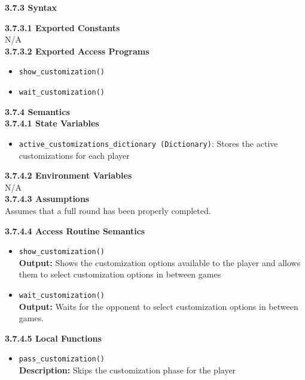 \documentclass[12pt, titlepage]{article}
\begin{document}
\noindent \textbf{3.7.3 Syntax}

\noindent \textbf{3.7.3.1 Exported Constants}\\
N/A\\

\textbf{3.7.3.2 Exported Access Programs}
\begin{itemize}
	\item \texttt{show\_customization()}
	\item \texttt{wait\_customization()}
	
	
\end{itemize}

\noindent \textbf{3.7.4 Semantics}\\
\textbf{3.7.4.1 State Variables}\\

\begin{itemize}
    \item \texttt{active\_customizations\_dictionary (Dictionary)}: Stores the active customizations for each player 

\end{itemize}

\textbf{3.7.4.2 Environment Variables}\\

N/A\\



\textbf{3.7.4.3 Assumptions}\\
Assumes that a full round has been properly completed.

\textbf{3.7.4.4 Access Routine Semantics}
\begin{itemize}

	\item \texttt{show\_customization()}\\
	\textbf{Output:} Shows the customization options available to the player and allows them to select customization options in between games
	
	\item \texttt{wait\_customization()}\\
	\textbf{Output:} Waits for the opponent to select customization options in between games.
	
	


\end{itemize}

\textbf{3.7.4.5 Local Functions}

\begin{itemize}
    \item \texttt{pass\_customization()}\\
    	\textbf{Description:} Skips the customization phase for the player
\end{itemize}
\end{document}
